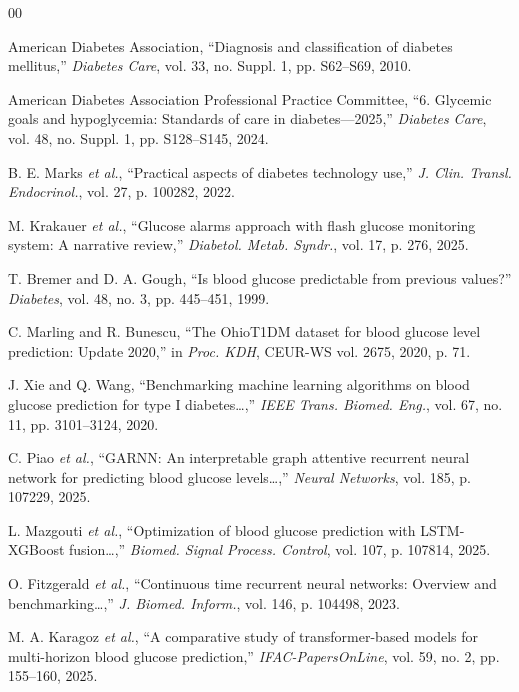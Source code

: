 \documentclass[conference]{IEEEtran}
\begin{document}
\begin{thebibliography}{00}

American Diabetes Association, ``Diagnosis and classification of diabetes
mellitus,'' \emph{Diabetes Care}, vol. 33, no. Suppl. 1, pp. S62--S69, 2010.

American Diabetes Association Professional Practice Committee, ``6. Glycemic goals
and hypoglycemia: Standards of care in diabetes---2025,'' \emph{Diabetes Care},
vol. 48, no. Suppl. 1, pp. S128--S145, 2024.

B. E. Marks \emph{et al.}, ``Practical aspects of diabetes technology use,''
\emph{J. Clin. Transl. Endocrinol.}, vol. 27, p. 100282, 2022.

M. Krakauer \emph{et al.}, ``Glucose alarms approach with flash glucose monitoring
system: A narrative review,'' \emph{Diabetol. Metab. Syndr.}, vol. 17, p. 276, 2025.

T. Bremer and D. A. Gough, ``Is blood glucose predictable from previous values?''
\emph{Diabetes}, vol. 48, no. 3, pp. 445--451, 1999.

C. Marling and R. Bunescu, ``The OhioT1DM dataset for blood glucose level
prediction: Update 2020,'' in \emph{Proc. KDH}, CEUR-WS vol. 2675, 2020, p. 71.

J. Xie and Q. Wang, ``Benchmarking machine learning algorithms on blood glucose
prediction for type I diabetes\ldots,'' \emph{IEEE Trans. Biomed. Eng.}, vol. 67,
no. 11, pp. 3101--3124, 2020.

C. Piao \emph{et al.}, ``GARNN: An interpretable graph attentive recurrent neural
network for predicting blood glucose levels\ldots,'' \emph{Neural Networks}, vol.
185, p. 107229, 2025.

L. Mazgouti \emph{et al.}, ``Optimization of blood glucose prediction with
LSTM-XGBoost fusion\ldots,'' \emph{Biomed. Signal Process. Control}, vol. 107, p.
107814, 2025.

O. Fitzgerald \emph{et al.}, ``Continuous time recurrent neural networks:
Overview and benchmarking\ldots,'' \emph{J. Biomed. Inform.}, vol. 146, p. 104498,
2023.

M. A. Karagoz \emph{et al.}, ``A comparative study of transformer-based models for
multi-horizon blood glucose prediction,'' \emph{IFAC-PapersOnLine}, vol. 59, no.
2, pp. 155--160, 2025.


\end{thebibliography}
\end{document}
